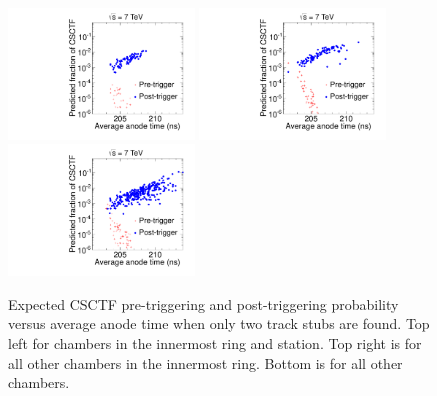 \begin{figure}
  \begin{center}
      \includegraphics[clip=true, trim=0.0cm 0cm 0.0cm 0cm, width=0.44\textwidth]{figures/timing/ME11_Anode_vs_TF_all} 
      \includegraphics[clip=true, trim=0.0cm 0cm 0.0cm 0cm, width=0.44\textwidth]{figures/timing/Ring1_not11_Anode_vs_TF_all} \\
      \includegraphics[clip=true, trim=0.0cm 0cm 0.0cm 0cm, width=0.44\textwidth]{figures/timing/Ring2_Anode_vs_TF_all} \\
      \caption[Excpected CSCTF pre-triggering and post-triggering probability versus average anode time]
      {Expected CSCTF pre-triggering and post-triggering probability versus average anode time when only two track stubs are found.
Top left for chambers in the innermost ring and station. Top right is for all other chambers in the innermost ring.
Bottom is for all other chambers.
        }
      \label{fig:AnodevsprePostCSCTF}
  \end{center}
\end{figure}

